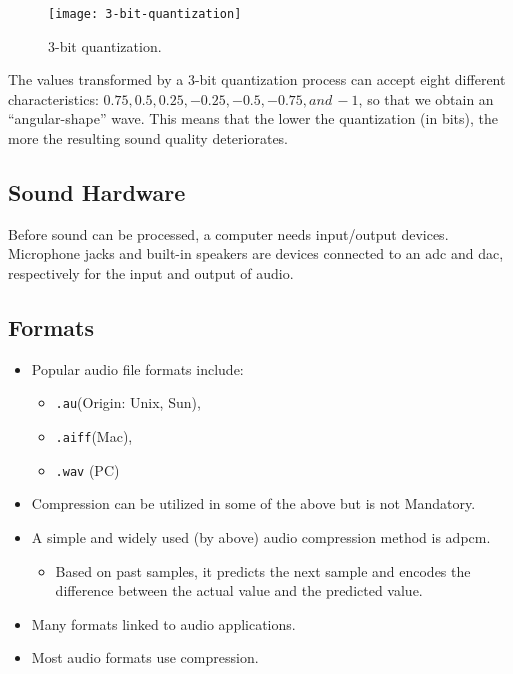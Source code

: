 \begin{figure}[H]
	\centering
		\texttt{[image: 3-bit-quantization]}
	\caption{3-bit quantization.}{\label{fig:3bit-quantization}}
\end{figure}


The values transformed by a 3-bit quantization process can accept eight different
characteristics: \(0.75, 0.5, 0.25, -0.25, -0.5, -0.75, and\, -1\), so that we obtain an
“angular-shape” wave. This means that the lower the quantization (in bits), the more the
resulting sound quality deteriorates.

\subsection{Sound Hardware}
Before sound can be processed, a computer needs input/output devices. Microphone
jacks and built-in speakers are devices connected to an \gls{adc} and \gls{dac}, respectively for the input and output of audio.

\subsection{Formats}
\begin{itemize}
	\item Popular audio file formats include:
		\begin{itemize}
			\item \texttt{.au}(Origin: Unix, Sun),
			\item \texttt{.aiff}(Mac),
			\item \texttt{.wav} (PC)
		\end{itemize}
	\item Compression can be utilized in some of the above but is not Mandatory.
	\item A simple and widely used (by above) audio compression method is \gls{adpcm}.
			\begin{itemize}
				\item Based on past samples, it predicts the next sample and
				encodes the difference between the actual value and the
				predicted value.
			\end{itemize}
		\item Many formats linked to audio applications.
		\item Most audio formats use compression.
\end{itemize}

